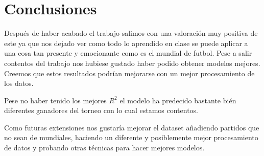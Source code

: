\section{Conclusiones}
Después de haber acabado el trabajo salimos con una valoración muy positiva de este ya que nos dejado ver como todo lo aprendido en clase se puede aplicar a una cosa tan presente y emocionante como es el mundial de futbol. Pese a salir contentos del trabajo nos hubiese gustado haber podido obtener modelos mejores. Creemos que estos resultados podrían mejorarse con un mejor procesamiento de los datos.
\newline

Pese no haber tenido los mejores $R^2$ el modelo ha predecido bastante bién diferentes ganadores del torneo con lo cual estamos contentos.
\newline

Como futuras extensiones nos gustaría mejorar el dataset añadiendo partidos que no sean de mundiales, haciendo un diferente y posiblemente mejor procesamiento de datos y probando otras técnicas para hacer mejores modelos.
\newpage